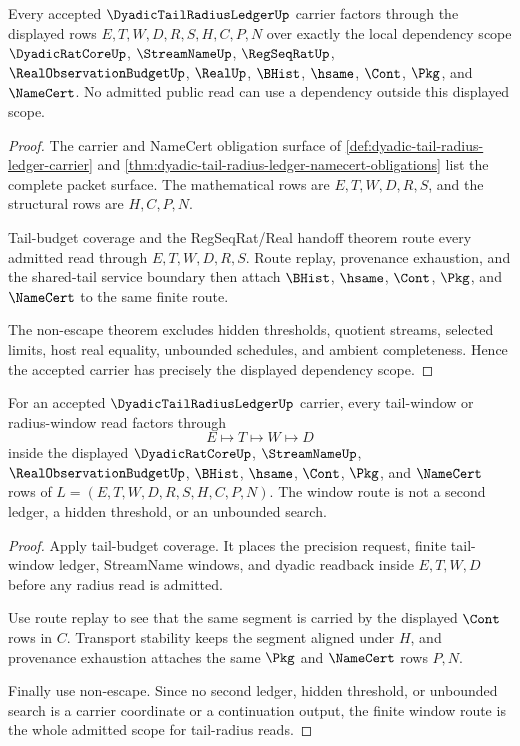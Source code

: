 \begin{theorem}
\label{thm:dyadic-tail-radius-ledger-dependency-scope}
Every accepted $\DyadicTailRadiusLedgerUp$ carrier factors through the displayed rows $E,T,W,D,R,S,H,C,P,N$ over exactly the local dependency scope $\DyadicRatCoreUp$, $\StreamNameUp$, $\RegSeqRatUp$, $\RealObservationBudgetUp$, $\RealUp$, $\BHist$, $\hsame$, $\Cont$, $\Pkg$, and $\NameCert$. No admitted public read can use a dependency outside this displayed scope.
\end{theorem}
\begin{proof}
The carrier and NameCert obligation surface of \autoref{def:dyadic-tail-radius-ledger-carrier} and \autoref{thm:dyadic-tail-radius-ledger-namecert-obligations} list the complete packet surface. The mathematical rows are $E,T,W,D,R,S$, and the structural rows are $H,C,P,N$.

Tail-budget coverage and the RegSeqRat/Real handoff theorem route every admitted read through $E,T,W,D,R,S$. Route replay, provenance exhaustion, and the shared-tail service boundary then attach $\BHist$, $\hsame$, $\Cont$, $\Pkg$, and $\NameCert$ to the same finite route.

The non-escape theorem excludes hidden thresholds, quotient streams, selected limits, host real equality, unbounded schedules, and ambient completeness. Hence the accepted carrier has precisely the displayed dependency scope.
\end{proof}

\begin{theorem}
\label{thm:dyadic-tail-radius-ledger-window-route-scope}
For an accepted $\DyadicTailRadiusLedgerUp$ carrier, every tail-window or radius-window read factors through
$$
E \longmapsto T \longmapsto W \longmapsto D
$$
inside the displayed $\DyadicRatCoreUp$, $\StreamNameUp$, $\RealObservationBudgetUp$, $\BHist$, $\hsame$, $\Cont$, $\Pkg$, and $\NameCert$ rows of $L=(E,T,W,D,R,S,H,C,P,N)$. The window route is not a second ledger, a hidden threshold, or an unbounded search.
\end{theorem}
\begin{proof}
Apply tail-budget coverage. It places the precision request, finite tail-window ledger, StreamName windows, and dyadic readback inside $E,T,W,D$ before any radius read is admitted.

Use route replay to see that the same segment is carried by the displayed $\Cont$ rows in $C$. Transport stability keeps the segment aligned under $H$, and provenance exhaustion attaches the same $\Pkg$ and $\NameCert$ rows $P,N$.

Finally use non-escape. Since no second ledger, hidden threshold, or unbounded search is a carrier coordinate or a continuation output, the finite window route is the whole admitted scope for tail-radius reads.
\end{proof}


